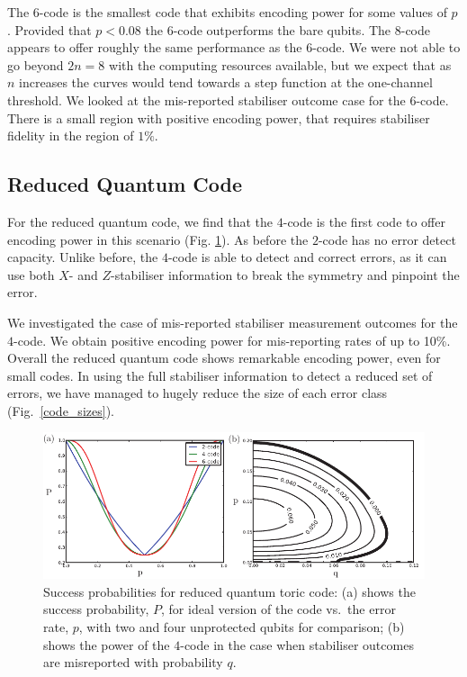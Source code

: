 The $6$-code is the smallest code that exhibits encoding power for some values of $p$. Provided that $p < 0.08$ the $6$-code outperforms the bare qubits. The $8$-code appears to offer roughly the same performance as the $6$-code. We were not  able to go beyond $2n=8$ with the computing resources available, but we expect that as $n$ increases the curves would tend towards a step function at the one-channel threshold.  We looked at the mis-reported stabiliser outcome case for the $6$-code. There is a small region with positive encoding power, that requires stabiliser fidelity in the region of $1\%$.

\subsection{Reduced Quantum Code}

For the reduced quantum code, we find that the $4$-code is the first code to offer encoding power in this scenario (Fig. \ref{y_results}). As before the $2$-code has no error detect capacity. Unlike before, the $4$-code is able to detect and correct errors, as it can use both $X$- and $Z$-stabiliser information to break the symmetry and pinpoint the error. 

We investigated the case of mis-reported stabiliser measurement outcomes for the $4$-code. We obtain positive encoding power for mis-reporting rates of up to 10\%. Overall the reduced quantum code shows remarkable encoding power, even for small codes. In using the full stabiliser information to detect a reduced set of errors, we have managed to hugely reduce the size of each error class (Fig.~\ref{code_sizes}). 
\begin{figure}[htb]
  \begin{center}
    \includegraphics{assets/y_results.pdf}
  \end{center}
  \caption{Success probabilities for reduced quantum toric code: (a) shows the success probability, $P$, for ideal version of the code vs.\ the error rate, $p$, with two and four unprotected qubits for comparison; (b) shows the power of the $4$-code in the case when stabiliser outcomes are misreported with probability $q$.}
  \label{y_results}
\end{figure}


